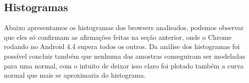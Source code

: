 \documentclass[11pt,a4paper]{article}
\begin{document}
\begin{figure}[H]
\begin{subfigure}{.5\textwidth}
        \label{nexus44200}
    \end{subfigure}
\end{figure}


\subsection{Histogramas}\label{histogramas}

Abaixo apresentamos os histogramas dos browsers analisados, podemos observar que eles só confirmam as afirmações feitas
na seção anterior, onde o Chrome rodando no Android 4.4 supera todos os outros. Da análise dos histogramas foi possível
concluir também que nenhuma das amostras conseguiram ser modeladas para uma normal, com o intuito de deixar isso claro
foi plotado também a curva normal que mais se aproximaria do histograma.
\end{document}
